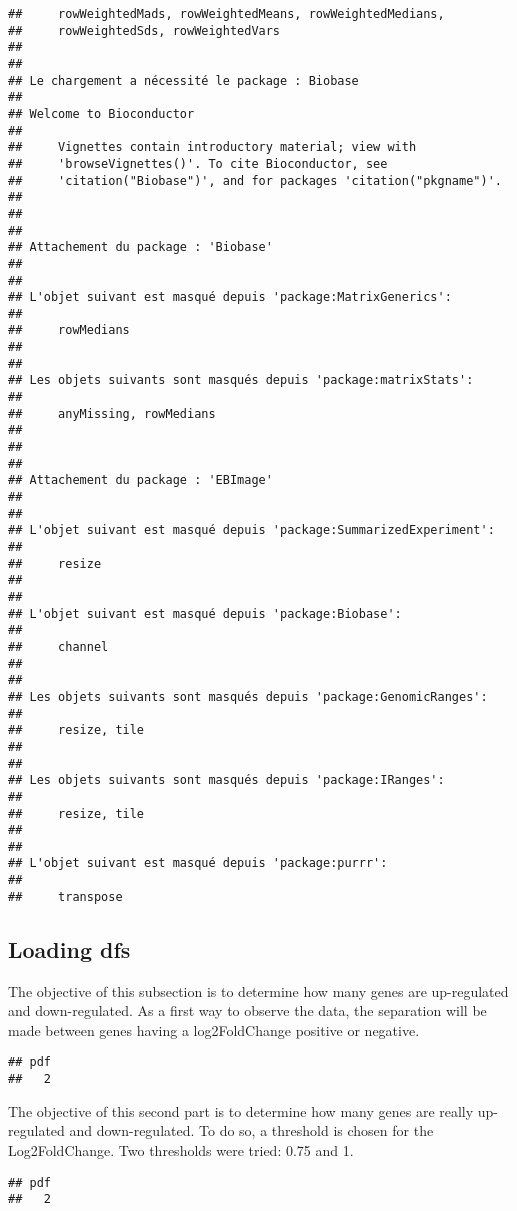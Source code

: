 \documentclass[
]{article}
\begin{document}
\begin{verbatim}
##     rowWeightedMads, rowWeightedMeans, rowWeightedMedians,
##     rowWeightedSds, rowWeightedVars
## 
## 
## Le chargement a nécessité le package : Biobase
## 
## Welcome to Bioconductor
## 
##     Vignettes contain introductory material; view with
##     'browseVignettes()'. To cite Bioconductor, see
##     'citation("Biobase")', and for packages 'citation("pkgname")'.
## 
## 
## 
## Attachement du package : 'Biobase'
## 
## 
## L'objet suivant est masqué depuis 'package:MatrixGenerics':
## 
##     rowMedians
## 
## 
## Les objets suivants sont masqués depuis 'package:matrixStats':
## 
##     anyMissing, rowMedians
## 
## 
## 
## Attachement du package : 'EBImage'
## 
## 
## L'objet suivant est masqué depuis 'package:SummarizedExperiment':
## 
##     resize
## 
## 
## L'objet suivant est masqué depuis 'package:Biobase':
## 
##     channel
## 
## 
## Les objets suivants sont masqués depuis 'package:GenomicRanges':
## 
##     resize, tile
## 
## 
## Les objets suivants sont masqués depuis 'package:IRanges':
## 
##     resize, tile
## 
## 
## L'objet suivant est masqué depuis 'package:purrr':
## 
##     transpose
\end{verbatim}

\hypertarget{loading-dfs}{%
\subsection{Loading dfs}\label{loading-dfs}}

The objective of this subsection is to determine how many genes are
up-regulated and down-regulated. As a first way to observe the data, the
separation will be made between genes having a log2FoldChange positive
or negative.

\begin{verbatim}
## pdf 
##   2
\end{verbatim}

The objective of this second part is to determine how many genes are
really up-regulated and down-regulated. To do so, a threshold is chosen
for the Log2FoldChange. Two thresholds were tried: 0.75 and 1.

\begin{verbatim}
## pdf 
##   2
\end{verbatim}
\end{document}
